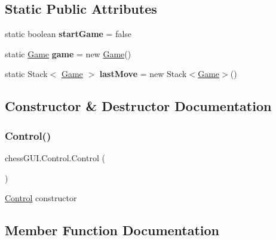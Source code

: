 \subsection*{Static Public Attributes}
\begin{DoxyCompactItemize}
\item 
\mbox{\label{classchess_g_u_i_1_1_control_a3cfa23bfb0c24f9f4518336ff7bc0317}} 
static boolean {\bfseries start\+Game} = false
\item 
\mbox{\label{classchess_g_u_i_1_1_control_a8e1a9728ff532915917a1ba7d56647f3}} 
static \hyperlink{classchess_build_1_1_game}{Game} {\bfseries game} = new \hyperlink{classchess_build_1_1_game}{Game}()
\item 
\mbox{\label{classchess_g_u_i_1_1_control_aeeb4b2ebf477ff865e7ec04878f0203d}} 
static Stack$<$ \hyperlink{classchess_build_1_1_game}{Game} $>$ {\bfseries last\+Move} = new Stack$<$\hyperlink{classchess_build_1_1_game}{Game}$>$()
\end{DoxyCompactItemize}


\subsection{Constructor \& Destructor Documentation}
\mbox{\label{classchess_g_u_i_1_1_control_ac90efc0d259e84d21ffa95fac1e63d42}} 
\subsubsection{\texorpdfstring{Control()}{Control()}}
{\footnotesize\ttfamily chess\+G\+U\+I.\+Control.\+Control (\begin{DoxyParamCaption}{ }\end{DoxyParamCaption})}

\hyperlink{classchess_g_u_i_1_1_control}{Control} constructor 

\subsection{Member Function Documentation}
\mbox{\label{classchess_g_u_i_1_1_control_aa88e3fa81b7dbfc40cd2b1bfaf120ab0}} 
